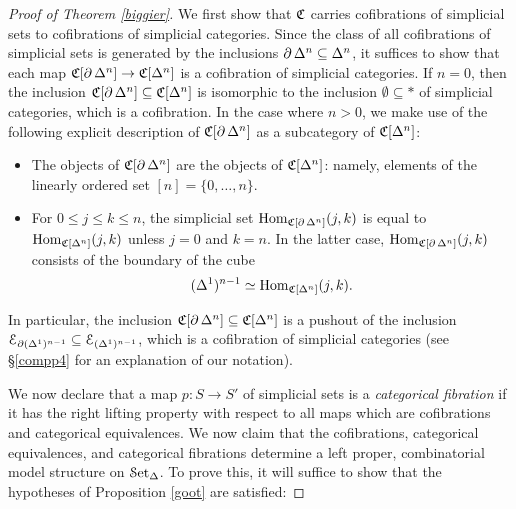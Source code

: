 \begin{proof}[Proof of Theorem \ref{biggier}]
We first show that $\operatorname{\mathfrak{C}}$ carries cofibrations of simplicial sets to cofibrations of simplicial categories. Since the class of all cofibrations of simplicial
sets is generated by the inclusions $\operatorname{\partial} \Delta^n \subseteq
\Delta^n$, it suffices to show that each map $\operatorname{\mathfrak{C}}[\operatorname{\partial}
\Delta^n] \rightarrow \operatorname{\mathfrak{C}}[\Delta^n]$ is a cofibration of
simplicial categories. If $n = 0$, then the inclusion $\operatorname{\mathfrak{C}}[\operatorname{\partial} \Delta^n] \subseteq
\operatorname{\mathfrak{C}}[\Delta^n]$ is isomorphic to the inclusion $\emptyset
\subseteq \ast$ of simplicial categories, which is a
cofibration. In the case where $n
> 0$, we make use of the following explicit description of
$\operatorname{\mathfrak{C}}[\operatorname{\partial} \Delta^n]$ as a subcategory of
$\operatorname{\mathfrak{C}}[\Delta^n]$:

\begin{itemize}
\item The objects of $\operatorname{\mathfrak{C}}[\operatorname{\partial} \Delta^n]$ are the objects of
$\operatorname{\mathfrak{C}}[\Delta^n]$: namely, elements of the linearly ordered
set $[n] = \{0, \ldots, n\}$. 

\item For $0 \leq j \leq k \leq n$, the simplicial set
$\operatorname{Hom}_{\operatorname{\mathfrak{C}}[\operatorname{\partial} \Delta^n]}(j,k)$ is equal to
$\operatorname{Hom}_{\operatorname{\mathfrak{C}}[\Delta^n]}(j,k)$ unless $j=0$ and $k=n$. In the
latter case, $\operatorname{Hom}_{\operatorname{\mathfrak{C}}[\operatorname{\partial} \Delta^n]}(j,k)$ consists of the
boundary of the cube 
$$(\Delta^1)^{n-1} \simeq
\operatorname{Hom}_{\operatorname{\mathfrak{C}}[\Delta^n]}(j,k).$$
\end{itemize}

In particular, the inclusion $\operatorname{\mathfrak{C}}[\operatorname{\partial} \Delta^n] \subseteq
\operatorname{\mathfrak{C}}[\Delta^n]$ is a pushout of the inclusion $\operatorname{\mathcal{E}}_{ \operatorname{\partial}
(\Delta^1)^{n-1} } \subseteq \operatorname{\mathcal{E}}_{ (\Delta^1)^{n-1} }$, which is
a cofibration of simplicial categories (see \S \ref{compp4} for an explanation of our notation).

We now declare that a map $p: S \rightarrow S'$ of simplicial sets is a {\it categorical
fibration} if it has the right lifting property with respect to
all maps which are cofibrations and categorical equivalences. We now claim that the cofibrations, categorical equivalences, and categorical fibrations determine a left proper, combinatorial model structure on $\operatorname{\mathcal{S}et_{\Delta}}$. To prove this, it will suffice to show that the hypotheses of Proposition \ref{goot} are satisfied:


\end{proof}
